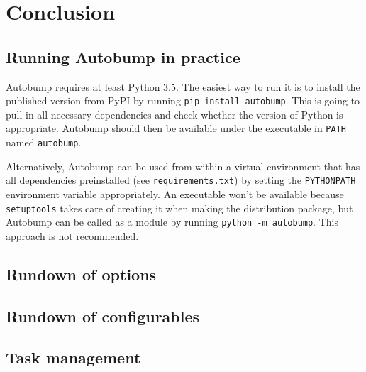 \documentclass{l4proj}
\newcommand\genericstyle{\lstset{basicstyle=\ttm}}
\newcommand\codeinline[1]{{\genericstyle\lstinline!#1!}}
\begin{document}
\chapter{Conclusion}
\label{Conclusion}





\begin{appendices}

\chapter{Running Autobump in practice}
\label{AutobumpInPractice}

Autobump requires at least Python 3.5. The easiest way to run it is to
install the published version from PyPI by running \codeinline{pip
install autobump}. This is going to pull in all necessary dependencies
and check whether the version of Python is appropriate. Autobump
should then be available under the executable in \codeinline{PATH}
named \codeinline{autobump}.

Alternatively, Autobump can be used from within a virtual environment
that has all dependencies preinstalled (see
\codeinline{requirements.txt}) by setting the \codeinline{PYTHONPATH}
environment variable appropriately. An executable won't be available
because \codeinline{setuptools} takes care of creating it when making
the distribution package, but Autobump can be called as a module by
running \codeinline{python -m autobump}. This approach is not recommended.

\section{Rundown of options}
\label{RundownOptions}

\section{Rundown of configurables}
\label{RundownConfigurables}

\section{Task management}


\end{appendices}
\end{document}
